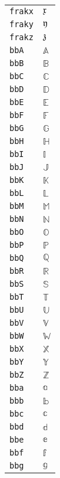 \begin{longtable}{ll}
\texttt{frakx}&${}\mathfrak{x} {}$\\
\texttt{fraky}&${}\mathfrak{y} {}$\\
\texttt{frakz}&${}\mathfrak{z} {}$\\
\texttt{bbA}&${}\mathbb{A}{}$\\
\texttt{bbB}&${}\mathbb{B}{}$\\
\texttt{bbC}&${}\mathbb{C}{}$\\
\texttt{bbD}&${}\mathbb{D}{}$\\
\texttt{bbE}&${}\mathbb{E}{}$\\
\texttt{bbF}&${}\mathbb{F}{}$\\
\texttt{bbG}&${}\mathbb{G}{}$\\
\texttt{bbH}&${}\mathbb{H}{}$\\
\texttt{bbI}&${}\mathbb{I}{}$\\
\texttt{bbJ}&${}\mathbb{J}{}$\\
\texttt{bbK}&${}\mathbb{K}{}$\\
\texttt{bbL}&${}\mathbb{L}{}$\\
\texttt{bbM}&${}\mathbb{M}{}$\\
\texttt{bbN}&${}\mathbb{N}{}$\\
\texttt{bbO}&${}\mathbb{O}{}$\\
\texttt{bbP}&${}\mathbb{P}{}$\\
\texttt{bbQ}&${}\mathbb{Q}{}$\\
\texttt{bbR}&${}\mathbb{R}{}$\\
\texttt{bbS}&${}\mathbb{S}{}$\\
\texttt{bbT}&${}\mathbb{T}{}$\\
\texttt{bbU}&${}\mathbb{U}{}$\\
\texttt{bbV}&${}\mathbb{V}{}$\\
\texttt{bbW}&${}\mathbb{W}{}$\\
\texttt{bbX}&${}\mathbb{X}{}$\\
\texttt{bbY}&${}\mathbb{Y}{}$\\
\texttt{bbZ}&${}\mathbb{Z}{}$\\
\texttt{bba}&${}\mathbb{a}{}$\\
\texttt{bbb}&${}\mathbb{b}{}$\\
\texttt{bbc}&${}\mathbb{c}{}$\\
\texttt{bbd}&${}\mathbb{d}{}$\\
\texttt{bbe}&${}\mathbb{e}{}$\\
\texttt{bbf}&${}\mathbb{f}{}$\\
\texttt{bbg}&${}\mathbb{g}{}$\\

\end{longtable}
